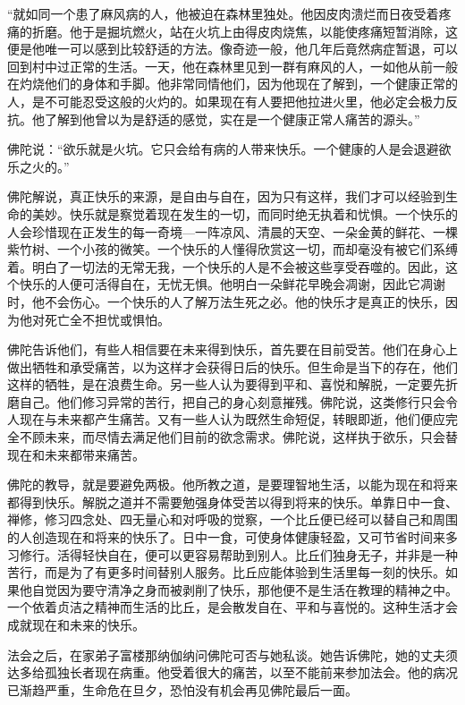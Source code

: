 \documentclass[12pt,twoside,openany]{book}
\begin{document}
“就如同一个患了麻风病的人，他被迫在森林里独处。他因皮肉溃烂而日夜受着疼痛的折磨。他于是掘坑燃火，站在火坑上由得皮肉烧焦，以能使疼痛短暂消除，这便是他唯一可以感到比较舒适的方法。像奇迹一般，他几年后竟然病症暂退，可以回到村中过正常的生活。一天，他在森林里见到一群有麻风的人，一如他从前一般在灼烧他们的身体和手脚。他非常同情他们，因为他现在了解到，一个健康正常的人，是不可能忍受这般的火灼的。如果现在有人要把他拉进火里，他必定会极力反抗。他了解到他曾以为是舒适的感觉，实在是一个健康正常人痛苦的源头。”

佛陀说：“欲乐就是火坑。它只会给有病的人带来快乐。一个健康的人是会退避欲乐之火的。”

佛陀解说，真正快乐的来源，是自由与自在，因为只有这样，我们才可以经验到生命的美妙。快乐就是察觉着现在发生的一切，而同时绝无执着和忧惧。一个快乐的人会珍惜现在正发生的每一奇境---一阵凉风、清晨的天空、一朵金黄的鲜花、一棵紫竹树、一个小孩的微笑。一个快乐的人懂得欣赏这一切，而却毫没有被它们系缚着。明白了一切法的无常无我，一个快乐的人是不会被这些享受吞噬的。因此，这个快乐的人便可活得自在，无忧无惧。他明白一朵鲜花早晚会凋谢，因此它凋谢时，他不会伤心。一个快乐的人了解万法生死之必。他的快乐才是真正的快乐，因为他对死亡全不担忧或惧怕。

佛陀告诉他们，有些人相信要在未来得到快乐，首先要在目前受苦。他们在身心上做出牺牲和承受痛苦，以为这样才会获得日后的快乐。但生命是当下的存在，他们这样的牺牲，是在浪费生命。另一些人认为要得到平和、喜悦和解脱，一定要先折磨自己。他们修习异常的苦行，把自己的身心刻意摧残。佛陀说，这类修行只会令人现在与未来都产生痛苦。又有一些人认为既然生命短促，转眼即逝，他们便应完全不顾未来，而尽情去满足他们目前的欲念需求。佛陀说，这样执于欲乐，只会替现在和未来都带来痛苦。

佛陀的教导，就是要避免两极。他所教之道，是要理智地生活，以能为现在和将来都得到快乐。解脱之道并不需要勉强身体受苦以得到将来的快乐。单靠日中一食、禅修，修习四念处、四无量心和对呼吸的觉察，一个比丘便已经可以替自己和周围的人创造现在和将来的快乐了。日中一食，可使身体健康轻盈，又可节省时间来多习修行。活得轻快自在，便可以更容易帮助到别人。比丘们独身无子，并非是一种苦行，而是为了有更多时间替别人服务。比丘应能体验到生活里每一刻的快乐。如果他自觉因为要守清净之身而被剥削了快乐，那他便不是生活在教理的精神之中。一个依着贞洁之精神而生活的比丘，是会散发自在、平和与喜悦的。这种生活才会成就现在和未来的快乐。

法会之后，在家弟子富楼那纳伽纳问佛陀可否与她私谈。她告诉佛陀，她的丈夫须达多给孤独长者现在病重。他受着很大的痛苦，以至不能前来参加法会。他的病况已渐趋严重，生命危在旦夕，恐怕没有机会再见佛陀最后一面。
\end{document}
